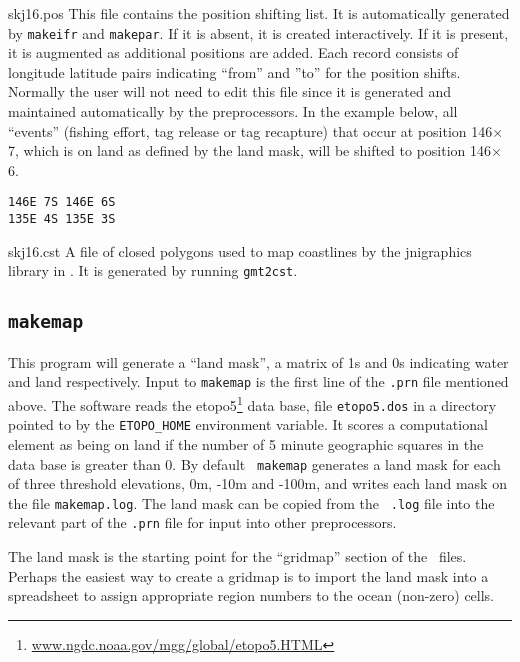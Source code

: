 \begin{description}
\item{skj16.pos} This file contains the position shifting list. It is
automatically generated by {\tt makeifr} and {\tt makepar}. If it is
absent, it is created interactively. If it is present, it is augmented
as additional positions are added. Each record consists of longitude
latitude pairs indicating ``from'' and ''to'' for the position shifts.
Normally the user will not need to edit this file since it is
generated and maintained automatically by the preprocessors. In the
example below, all ``events'' (fishing effort, tag release or tag
recapture) that occur at position 146$\times$7,
which is on land as defined by the land mask,
will be shifted to position 146$\times$6.
{\par{}\normalbaselineskip
\begin{verbatim}
146E 7S 146E 6S
135E 4S 135E 3S
\end{verbatim}
\par}

\item{skj16.cst} A file of closed polygons used to map coastlines by
the jnigraphics library in \TM. It is generated by running {\tt gmt2cst}.
\end{description}

\subsection*{{\tt makemap}}
This program will generate a ``land mask'', a matrix of 1s and 0s
indicating water and land respectively.  Input to {\tt makemap} is the first
line of the {\tt .prn} file mentioned above. The software reads the
etopo5\footnote{\href{http://www.ngdc.noaa.gov/mgg/global/etopo5.HTML}
{www.ngdc.noaa.gov/mgg/global/etopo5.HTML}}
data base, file  {\tt etopo5.dos} in a directory
pointed to by the {\tt ETOPO\_HOME} environment variable. It scores a
computational element as being on land if the number of 5 minute
geographic squares in the data base is greater than 0. By default {\tt
makemap} generates a land mask for each of three threshold elevations,
0m, -10m and -100m, and writes each land mask on the 
file {\tt makemap.log}. The land mask can be copied from the {\tt
.log} file into the relevant part of the {\tt .prn} file for input
into other preprocessors.
 
The land mask is the starting point for the ``gridmap'' section of the
\PAR\ files. Perhaps the easiest way to create a gridmap is to import
the land mask into a spreadsheet to assign appropriate region numbers
to the ocean (non-zero) cells.

